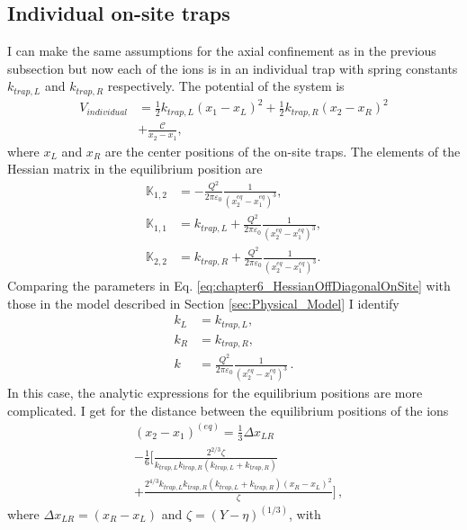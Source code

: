 \subsection{Individual on-site traps}
%
%
%
I can make the same assumptions for the axial confinement as in the previous subsection but now each of the ions is in an individual trap with spring constants $k_{trap,L}$ and $k_{trap,R}$ respectively. The potential of the system is
%
\begin{align}
    V_{individual} &= \frac{1}{2}k_{trap,L}\left(x_1 -x_L\right)^2 +\frac{1}{2}k_{trap, R}\left(x_2 -x_R\right)^2 \nonumber \\&+ \frac{\mathcal{C}}{x_2-x_1},
\end{align}
%
where $x_L$ and $x_R$ are the center positions of the on-site traps. The elements of the Hessian matrix in the equilibrium position are
%
\begin{align}
  \mathbb{K}_{1,2} &= -\frac{Q^2}{2\pi\varepsilon_0}\frac{1}{(x_2^{eq}-x_1^{eq})^3},\nonumber
  \\
  \mathbb{K}_{1,1} &= k_{trap,L} + \frac{Q^2}{2\pi\varepsilon_0}\frac{1}{(x_2^{eq}-x_1^{eq})^3},\nonumber
  \\
  \mathbb{K}_{2,2} &= k_{trap,R} + \frac{Q^2}{2\pi\varepsilon_0}\frac{1}{(x_2^{eq}-x_1^{eq})^3}.
  \label{eq:chapter6_HessianOffDiagonalOnSite}
\end{align}
%
Comparing the parameters in Eq. \eqref{eq:chapter6_HessianOffDiagonalOnSite} with those in the model described in Section \ref{sec:Physical_Model} I identify
\begin{align}
  k_L &= k_{trap,L},\nonumber\\
  k_R &= k_{trap,R},\nonumber\\
  k &= \frac{Q^2}{2\pi\varepsilon_0}\frac{1}{(x_2^{eq}-x_1^{eq})^3}\,.
\end{align}
%
In this case, the analytic expressions for the equilibrium positions are more complicated. I get for the distance between the equilibrium positions of the ions
%
\begin{align}
  &(x_2 - x_1)^{(eq)} = \frac{1}{3} \Delta x_{LR}\nonumber\\
  &- \frac{1}{6}\Big[ \frac{2^{2/3}\zeta}{k_{trap,L} k_{trap,R} (k_{trap,L} + k_{trap,R})}\nonumber\\
  &+ \frac{2^{4/3} k_{trap,L} k_{trap,R} (k_{trap,L} + k_{trap,R}) (x_R-x_L)^2}{\zeta} \Big]\,,
\end{align}
%
where $\Delta x_{LR} = (x_R-x_L)$ and $\zeta = \left( Y - \eta \right)^{(1/3)}$, with

